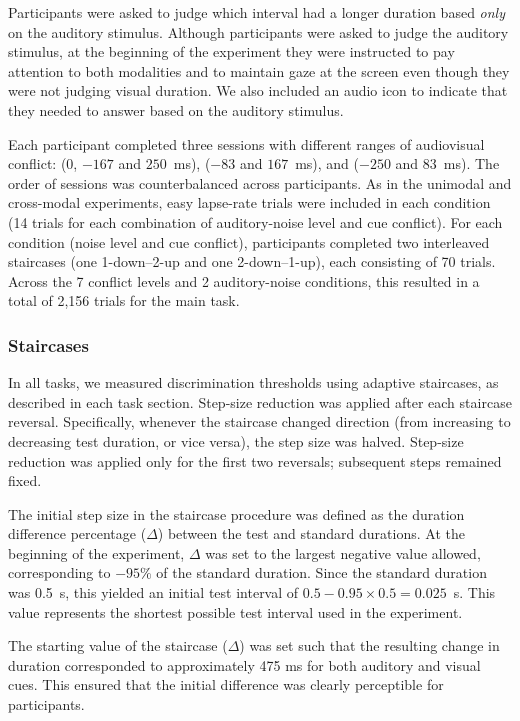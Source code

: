 \documentclass{biorxiv}
\begin{document}
Participants were asked to judge which interval had a longer duration based {\em only} on the auditory stimulus. Although participants were asked to judge the auditory stimulus, at the beginning of the experiment they were instructed to pay attention to both modalities and to maintain gaze at the screen even though they were not judging visual duration. We also included an audio icon to indicate that they needed to answer based on the auditory stimulus.

Each participant completed three sessions with different ranges of audiovisual conflict: (0, $-167$ and $250$~ms), ($-83$ and $167$~ms), and ($-250$ and $83$~ms). The order of sessions was counterbalanced across participants. As in the unimodal and cross-modal experiments, easy lapse-rate trials were included in each condition (14 trials for each combination of auditory-noise level and cue conflict). For each condition (noise level and cue conflict), participants completed two interleaved staircases (one 1-down–2-up and one 2-down–1-up), each consisting of 70 trials. Across the 7 conflict levels and 2 auditory-noise conditions, this resulted in a total of 2,156 trials for the main task.

\subsubsection{Staircases}

In all tasks, we measured discrimination thresholds using adaptive staircases, as described in each task section. Step-size reduction was applied after each staircase reversal. Specifically, whenever the staircase changed direction (from increasing to decreasing test duration, or vice versa), the step size was halved. Step-size reduction was applied only for the first two reversals; subsequent steps remained fixed.

The initial step size in the staircase procedure was defined as the duration difference percentage ($\Delta$) between the test and standard durations. At the beginning of the experiment, $\Delta$ was set to the largest negative value allowed, corresponding to $-95\%$ of the standard duration. Since the standard duration was 0.5~s, this yielded an initial test interval of $0.5 - 0.95 \times 0.5 = 0.025$~s. This value represents the shortest possible test interval used in the experiment.

The starting value of the staircase ($\Delta$) was set such that the resulting change in duration corresponded to approximately 475 ms for both auditory and visual cues. This ensured that the initial difference was clearly perceptible for participants.
\end{document}
